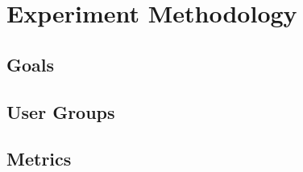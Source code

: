 

\section{Experiment Methodology}
\label{sec:experiment-methodology}


\subsection{Goals}


\subsection{User Groups}




\subsection{Metrics}

